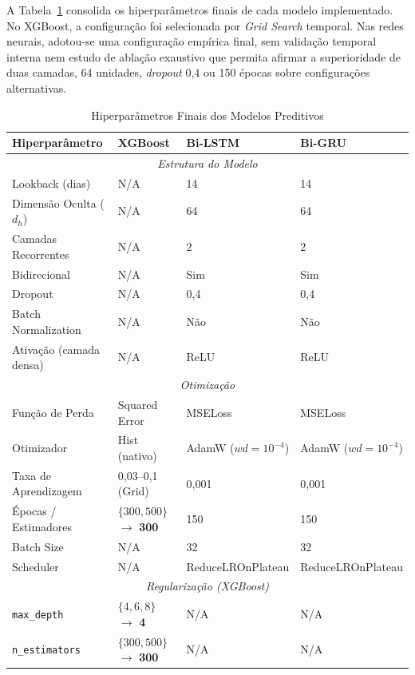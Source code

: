 A Tabela~\ref{tab:hiperparametros} consolida os hiperparâmetros finais de cada modelo implementado. No XGBoost, a configuração foi selecionada por \textit{Grid Search} temporal. Nas redes neurais, adotou-se uma configuração empírica final, sem validação temporal interna nem estudo de ablação exaustivo que permita afirmar a superioridade de duas camadas, 64 unidades, \textit{dropout} 0,4 ou 150 épocas sobre configurações alternativas.

\begin{table}[H]
\caption{Hiperparâmetros Finais dos Modelos Preditivos}
\label{tab:hiperparametros}
\begin{center}
\small
\renewcommand{\arraystretch}{0.94}
\begin{tabular}{p{4cm} p{2.8cm} p{2.8cm} p{2.8cm}}
\toprule
\textbf{Hiperparâmetro} & \textbf{XGBoost} & \textbf{Bi-LSTM} & \textbf{Bi-GRU} \\
\midrule
\multicolumn{4}{c}{\textit{Estrutura do Modelo}} \\
\midrule
Lookback (dias) & N/A & 14 & 14 \\
Dimensão Oculta ($d_h$) & N/A & 64 & 64 \\
Camadas Recorrentes & N/A & 2 & 2 \\
Bidirecional & N/A & Sim & Sim \\
Dropout & N/A & 0,4 & 0,4 \\
Batch Normalization & N/A & Não & Não \\
Ativação (camada densa) & N/A & ReLU & ReLU \\
\midrule
\multicolumn{4}{c}{\textit{Otimização}} \\
\midrule
Função de Perda & Squared Error & MSELoss & MSELoss \\
Otimizador & Hist (nativo) & AdamW ($wd=10^{-4}$) & AdamW ($wd=10^{-4}$) \\
Taxa de Aprendizagem & 0,03--0,1 (Grid) & 0,001 & 0,001 \\
Épocas / Estimadores & $\{300, 500\}$ $\to$ \textbf{300} & 150 & 150 \\
Batch Size & N/A & 32 & 32 \\
Scheduler & N/A & ReduceLR\-OnPlateau & ReduceLR\-OnPlateau \\
\midrule
\multicolumn{4}{c}{\textit{Regularização (XGBoost)}} \\
\midrule
\texttt{max\_depth} & $\{4, 6, 8\}$ $\to$ \textbf{4} & N/A & N/A \\
\texttt{n\_estimators} & $\{300, 500\}$ $\to$ \textbf{300} & N/A & N/A \\

\end{tabular}
\end{center}
\end{table}
